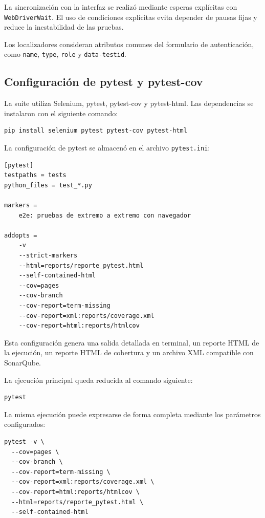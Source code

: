 \documentclass[12pt,letterpaper]{article}
\begin{document}
La sincronización con la interfaz se realizó mediante esperas explícitas con \texttt{WebDriverWait}. El uso de condiciones explícitas evita depender de pausas fijas y reduce la inestabilidad de las pruebas.

Los localizadores consideran atributos comunes del formulario de autenticación, como \texttt{name}, \texttt{type}, \texttt{role} y \texttt{data-testid}.

\subsection{Configuración de pytest y pytest-cov}

La suite utiliza Selenium, pytest, pytest-cov y pytest-html. Las dependencias se instalaron con el siguiente comando:

\begin{lstlisting}[caption={Instalación de dependencias para la suite}]
pip install selenium pytest pytest-cov pytest-html
\end{lstlisting}

La configuración de pytest se almacenó en el archivo \texttt{pytest.ini}:

\begin{lstlisting}[caption={Configuración del archivo \texttt{pytest.ini}}]
[pytest]
testpaths = tests
python_files = test_*.py

markers =
    e2e: pruebas de extremo a extremo con navegador

addopts =
    -v
    --strict-markers
    --html=reports/reporte_pytest.html
    --self-contained-html
    --cov=pages
    --cov-branch
    --cov-report=term-missing
    --cov-report=xml:reports/coverage.xml
    --cov-report=html:reports/htmlcov
\end{lstlisting}

Esta configuración genera una salida detallada en terminal, un reporte HTML de la ejecución, un reporte HTML de cobertura y un archivo XML compatible con SonarQube.

La ejecución principal queda reducida al comando siguiente:

\begin{lstlisting}[caption={Ejecución mediante la configuración de \texttt{pytest.ini}}]
pytest
\end{lstlisting}

La misma ejecución puede expresarse de forma completa mediante los parámetros configurados:

\begin{lstlisting}[caption={Ejecución de pruebas y generación de reportes}]
pytest -v \
  --cov=pages \
  --cov-branch \
  --cov-report=term-missing \
  --cov-report=xml:reports/coverage.xml \
  --cov-report=html:reports/htmlcov \
  --html=reports/reporte_pytest.html \
  --self-contained-html
\end{lstlisting}
\end{document}
